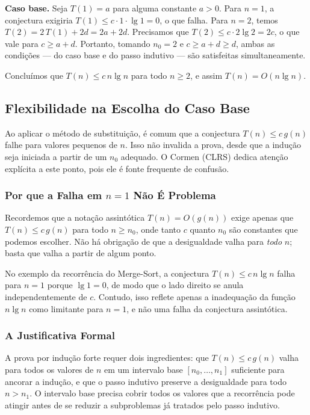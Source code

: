 \documentclass[9pt,a4paper]{extarticle}
\begin{document}
\textbf{Caso base.} Seja $T(1) = a$ para alguma constante $a > 0$. Para $n = 1$, a conjectura exigiria $T(1) \leq c \cdot 1 \cdot \lg 1 = 0$, o que falha. Para $n = 2$, temos $T(2) = 2\,T(1) + 2d = 2a + 2d$. Precisamos que $T(2) \leq c \cdot 2 \lg 2 = 2c$, o que vale para $c \geq a + d$. Portanto, tomando $n_0 = 2$ e $c \geq a + d \geq d$, ambas as condições --- do caso base e do passo indutivo --- são satisfeitas simultaneamente.

Concluímos que $T(n) \leq c\,n\lg n$ para todo $n \geq 2$, e assim $T(n) = O(n \lg n)$.

\subsection{Flexibilidade na Escolha do Caso Base}

Ao aplicar o método de substituição, é comum que a conjectura $T(n) \leq c\,g(n)$ falhe para valores pequenos de $n$. Isso não invalida a prova, desde que a indução seja iniciada a partir de um $n_0$ adequado. O Cormen (CLRS) dedica atenção explícita a este ponto, pois ele é fonte frequente de confusão.

\subsubsection{Por que a Falha em $n = 1$ Não É Problema}

Recordemos que a notação assintótica $T(n) = O(g(n))$ exige apenas que $T(n) \leq c\,g(n)$ para todo $n \geq n_0$, onde tanto $c$ quanto $n_0$ são constantes que podemos escolher. Não há obrigação de que a desigualdade valha para \emph{todo} $n$; basta que valha a partir de algum ponto.

No exemplo da recorrência do Merge-Sort, a conjectura $T(n) \leq c\,n\lg n$ falha para $n = 1$ porque $\lg 1 = 0$, de modo que o lado direito se anula independentemente de $c$. Contudo, isso reflete apenas a inadequação da função $n \lg n$ como limitante para $n = 1$, e não uma falha da conjectura assintótica.

\subsubsection{A Justificativa Formal}

A prova por indução forte requer dois ingredientes: que $T(n) \leq c\,g(n)$ valha para todos os valores de $n$ em um intervalo base $[n_0, \ldots, n_1]$ suficiente para ancorar a indução, e que o passo indutivo preserve a desigualdade para todo $n > n_1$. O intervalo base precisa cobrir todos os valores que a recorrência pode atingir antes de se reduzir a subproblemas já tratados pelo passo indutivo.
\end{document}

